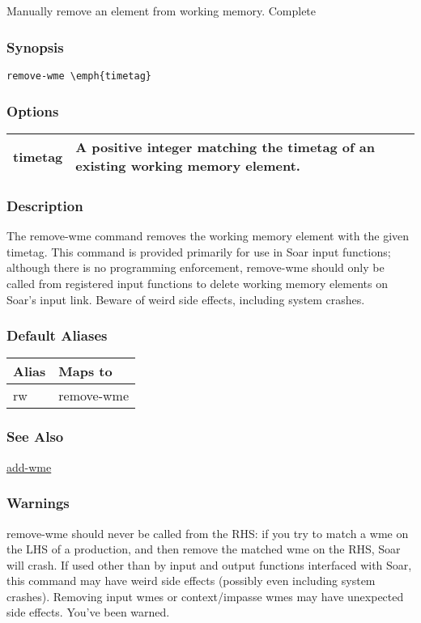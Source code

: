 \subsection{}
\label{remove-wme}
Manually remove an element from working memory. 
 Complete
\subsubsection*{Synopsis}
\begin{verbatim}
remove-wme \emph{timetag}
\end{verbatim}
\subsubsection*{Options}
\begin{tabular}{|l|l|}
\hline 
 timetag  & A positive integer matching the timetag of an existing working memory element.  \\
 \hline 
\end{tabular}
\subsubsection*{Description}
 The remove-wme command removes the working memory element with the given timetag. This command is provided primarily for use in Soar input functions; although there is no programming enforcement, remove-wme should only be called from registered input functions to delete working memory elements on Soar's input link. 
 Beware of weird side effects, including system crashes. 
\subsubsection*{Default Aliases}
\begin{tabular}{|l|l|}
\hline 
 Alias  & Maps to  \\
 \hline 
 rw  & remove-wme  \\
 \hline 
\end{tabular}
\subsubsection*{See Also}
\hyperref[add-wme]{add-wme} \subsubsection*{Warnings}
 remove-wme should never be called from the RHS: if you try to match a wme on the LHS of a production, and then remove the matched wme on the RHS, Soar will crash. 
 If used other than by input and output functions interfaced with Soar, this command may have weird side effects (possibly even including system crashes). Removing input wmes or context/impasse wmes may have unexpected side effects. You've been warned. 
